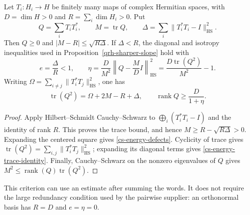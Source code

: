 \begin{proposition}\label{cs-exact-energy}
Let $T_i:H_i\to H$ be finitely many maps of complex Hermitian spaces,
with $D=\dim H>0$ and $R=\sum_i\dim H_i>0$. Put
\[
 Q=\sum_iT_iT_i^*,\qquad M=\operatorname{tr}Q,\qquad
 \Delta=\sum_i\|T_i^*T_i-I\|_{\mathrm{HS}}^2.
\]
Then $Q\ge0$ and $|M-R|\le\sqrt{R\Delta}$. If $\Delta<R$,
the diagonal and isotropy inequalities used in
Proposition~\ref{qrh-sharper-slope} hold with
\begin{equation}\label{cs-energy-defects}
 e=\frac\Delta R<1,\qquad
 \eta=\frac{D}{M^2}
       \left\|Q-\frac MD I\right\|_{\mathrm{HS}}^2
      =\frac{D\operatorname{tr}(Q^2)}{M^2}-1.
\end{equation}
Writing $\Omega=\sum_{i\ne j}\|T_i^*T_j\|_{\mathrm{HS}}^2$, one has
\begin{equation}\label{cs-energy-trace-identity}
 \operatorname{tr}(Q^2)=\Omega+2M-R+\Delta,
 \qquad \operatorname{rank}Q\ge\frac{D}{1+\eta}.
\end{equation}
\end{proposition}
\begin{proof}
Apply Hilbert--Schmidt Cauchy--Schwarz to
$\bigoplus_i(T_i^*T_i-I)$ and the identity of rank $R$. This proves
the trace bound, and hence $M\ge R-\sqrt{R\Delta}>0$.
Expanding the centered square gives \eqref{cs-energy-defects}.
Cyclicity of trace gives
$\operatorname{tr}(Q^2)=\sum_{i,j}\|T_i^*T_j\|_{\mathrm{HS}}^2$;
expanding its diagonal terms gives \eqref{cs-energy-trace-identity}.
Finally, Cauchy--Schwarz on the nonzero eigenvalues of $Q$ gives
$M^2\le\operatorname{rank}(Q)\operatorname{tr}(Q^2)$.
\end{proof}

This criterion can use an estimate after summing the words. It does not
require the large redundancy condition used by the pairwise supplier:
an orthonormal basis has $R=D$ and $e=\eta=0$.

